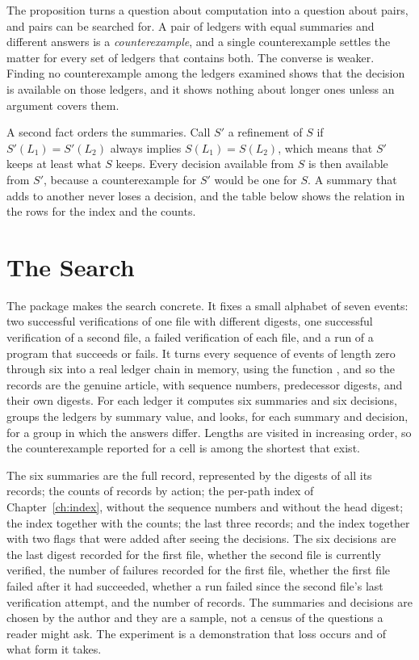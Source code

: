 The proposition turns a question about computation into a question about pairs, and pairs can be searched for. A pair of ledgers with equal summaries and different answers is a \emph{counterexample}, and a single counterexample settles the matter for every set of ledgers that contains both. The converse is weaker. Finding no counterexample among the ledgers examined shows that the decision is available on those ledgers, and it shows nothing about longer ones unless an argument covers them.

A second fact orders the summaries. Call $S'$ a refinement of $S$ if $S'(L_1) = S'(L_2)$ always implies $S(L_1) = S(L_2)$, which means that $S'$ keeps at least what $S$ keeps. Every decision available from $S$ is then available from $S'$, because a counterexample for $S'$ would be one for $S$. A summary that adds to another never loses a decision, and the table below shows the relation in the rows for the index and the counts.

\section{The Search}

The package  makes the search concrete. It fixes a small alphabet of seven events: two successful verifications of one file with different digests, one successful verification of a second file, a failed verification of each file, and a run of a program that succeeds or fails. It turns every sequence of events of length zero through six into a real ledger chain in memory, using the function , and so the records are the genuine article, with sequence numbers, predecessor digests, and their own digests. For each ledger it computes six summaries and six decisions, groups the ledgers by summary value, and looks, for each summary and decision, for a group in which the answers differ. Lengths are visited in increasing order, so the counterexample reported for a cell is among the shortest that exist.


The six summaries are the full record, represented by the digests of all its records; the counts of records by action; the per-path index of Chapter~\ref{ch:index}, without the sequence numbers and without the head digest; the index together with the counts; the last three records; and the index together with two flags that were added after seeing the decisions. The six decisions are the last digest recorded for the first file, whether the second file is currently verified, the number of failures recorded for the first file, whether the first file failed after it had succeeded, whether a run failed since the second file's last verification attempt, and the number of records. The summaries and decisions are chosen by the author and they are a sample, not a census of the questions a reader might ask. The experiment is a demonstration that loss occurs and of what form it takes.

